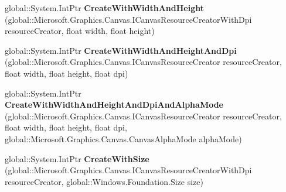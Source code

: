 \begin{DoxyCompactItemize}
\item 
\mbox{\label{interface_microsoft_1_1_graphics_1_1_canvas_1_1_u_i_1_1_xaml_1_1_i_canvas_image_source_factory_a10963349bb9cd2efbf8a9fd0e452503b}} 
global\+::\+System.\+Int\+Ptr {\bfseries Create\+With\+Width\+And\+Height} (global\+::\+Microsoft.\+Graphics.\+Canvas.\+I\+Canvas\+Resource\+Creator\+With\+Dpi resource\+Creator, float width, float height)
\item 
\mbox{\label{interface_microsoft_1_1_graphics_1_1_canvas_1_1_u_i_1_1_xaml_1_1_i_canvas_image_source_factory_a6cfd3bc04a35df5bd6c867d8ded122c0}} 
global\+::\+System.\+Int\+Ptr {\bfseries Create\+With\+Width\+And\+Height\+And\+Dpi} (global\+::\+Microsoft.\+Graphics.\+Canvas.\+I\+Canvas\+Resource\+Creator resource\+Creator, float width, float height, float dpi)
\item 
\mbox{\label{interface_microsoft_1_1_graphics_1_1_canvas_1_1_u_i_1_1_xaml_1_1_i_canvas_image_source_factory_a7f81e40660e111a979eb5fc6d370cce8}} 
global\+::\+System.\+Int\+Ptr {\bfseries Create\+With\+Width\+And\+Height\+And\+Dpi\+And\+Alpha\+Mode} (global\+::\+Microsoft.\+Graphics.\+Canvas.\+I\+Canvas\+Resource\+Creator resource\+Creator, float width, float height, float dpi, global\+::\+Microsoft.\+Graphics.\+Canvas.\+Canvas\+Alpha\+Mode alpha\+Mode)
\item 
\mbox{\label{interface_microsoft_1_1_graphics_1_1_canvas_1_1_u_i_1_1_xaml_1_1_i_canvas_image_source_factory_a4baedcf33415e7e6999fbfaef3bbfbcf}} 
global\+::\+System.\+Int\+Ptr {\bfseries Create\+With\+Size} (global\+::\+Microsoft.\+Graphics.\+Canvas.\+I\+Canvas\+Resource\+Creator\+With\+Dpi resource\+Creator, global\+::\+Windows.\+Foundation.\+Size size)
\item 
\mbox{\label{interface_microsoft_1_1_graphics_1_1_canvas_1_1_u_i_1_1_xaml_1_1_i_canvas_image_source_factory_a10963349bb9cd2efbf8a9fd0e452503b}} 

\end{DoxyCompactItemize}

